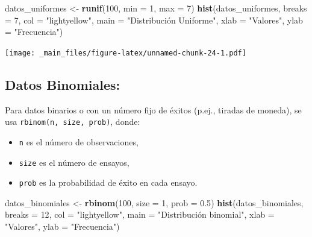 \documentclass[
]{book}
\newenvironment{Shaded}{\begin{snugshade}}{\end{snugshade}}
\newcommand{\AttributeTok}[1]{\textcolor[rgb]{0.13,0.29,0.53}{#1}}
\newcommand{\DecValTok}[1]{\textcolor[rgb]{0.00,0.00,0.81}{#1}}
\newcommand{\FloatTok}[1]{\textcolor[rgb]{0.00,0.00,0.81}{#1}}
\newcommand{\FunctionTok}[1]{\textcolor[rgb]{0.13,0.29,0.53}{\textbf{#1}}}
\newcommand{\NormalTok}[1]{#1}
\newcommand{\OtherTok}[1]{\textcolor[rgb]{0.56,0.35,0.01}{#1}}
\newcommand{\StringTok}[1]{\textcolor[rgb]{0.31,0.60,0.02}{#1}}
\providecommand{\tightlist}{%
  \setlength{\itemsep}{0pt}\setlength{\parskip}{0pt}}
\begin{document}
\begin{Shaded}
\begin{Highlighting}[]
\NormalTok{datos\_uniformes }\OtherTok{\textless{}{-}} \FunctionTok{runif}\NormalTok{(}\DecValTok{100}\NormalTok{, }\AttributeTok{min =} \DecValTok{1}\NormalTok{, }\AttributeTok{max =} \DecValTok{7}\NormalTok{)}
\FunctionTok{hist}\NormalTok{(datos\_uniformes, }
     \AttributeTok{breaks =} \DecValTok{7}\NormalTok{, }
     \AttributeTok{col =} \StringTok{"lightyellow"}\NormalTok{, }
     \AttributeTok{main =} \StringTok{"Distribución Uniforme"}\NormalTok{, }
     \AttributeTok{xlab =} \StringTok{"Valores"}\NormalTok{,}
     \AttributeTok{ylab =} \StringTok{"Frecuencia"}\NormalTok{)}
\end{Highlighting}
\end{Shaded}

\texttt{[image: \_main\_files/figure-latex/unnamed-chunk-24-1.pdf]}

\subsection{Datos Binomiales:}\label{datos-binomiales}

Para datos binarios o con un número fijo de éxitos (p.ej., tiradas de moneda), se usa \texttt{rbinom(n,\ size,\ prob)}, donde:

\begin{itemize}
\tightlist
\item
  \texttt{n} es el número de observaciones,\\
\item
  \texttt{size} es el número de ensayos,\\
\item
  \texttt{prob} es la probabilidad de éxito en cada ensayo.
\end{itemize}

\begin{Shaded}
\begin{Highlighting}[]
\NormalTok{datos\_binomiales }\OtherTok{\textless{}{-}} \FunctionTok{rbinom}\NormalTok{(}\DecValTok{100}\NormalTok{, }\AttributeTok{size =} \DecValTok{1}\NormalTok{, }\AttributeTok{prob =} \FloatTok{0.5}\NormalTok{)}
\FunctionTok{hist}\NormalTok{(datos\_binomiales, }
     \AttributeTok{breaks =} \DecValTok{12}\NormalTok{,}
     \AttributeTok{col =} \StringTok{"lightyellow"}\NormalTok{, }
     \AttributeTok{main =} \StringTok{"Distribución binomial"}\NormalTok{, }
     \AttributeTok{xlab =} \StringTok{"Valores"}\NormalTok{,}
     \AttributeTok{ylab =} \StringTok{"Frecuencia"}\NormalTok{)}
\end{Highlighting}
\end{Shaded}
\end{document}
